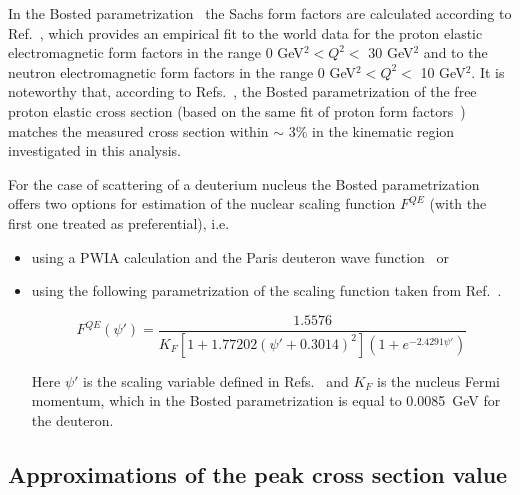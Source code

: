 In the Bosted parametrization~\cite{Bosted_fit,Bosted:2007xd} the Sachs form factors are calculated according to Ref.~\cite{Bosted:1994tm}, which provides an empirical fit to the world data for the proton elastic electromagnetic form factors in the range 0 GeV$^{2}$$< Q^{2} <$ 30 GeV$^{2}$ and to the neutron electromagnetic form factors in the range 0 GeV$^{2}$$< Q^{2} <$ 10 GeV$^{2}$. It is noteworthy that, according to Refs.~\cite{Fed_an_note:2017,Fed_paper_2018}, the Bosted parametrization of the free proton elastic cross section (based on the same fit of proton form factors~\cite{Bosted:1994tm}) matches the measured cross section within $\sim$ 3\% in the kinematic region investigated in this analysis.

For the case of scattering of a deuterium nucleus the Bosted parametrization~\cite{Bosted_fit,Bosted:2007xd} offers two options for estimation of the nuclear scaling function $F^{QE}$ (with the first one treated as preferential), i.e.\vspace{-0.25em}

\begin{itemize}
\item using a PWIA calculation and the Paris deuteron wave function~\cite{Bosted:2007xd} or\vspace{-0.25em}

\item using the following parametrization of the scaling function taken from Ref.~\cite{Bodek:2014pka}.\vspace{-0.25em}

\begin{equation}
F^{QE}(\psi') = \frac{1.5576}{K_{F}[1 + 1.77202(\psi' + 0.3014)^{2}](1 + e^{-2.4291\psi'})}\label{eq:fqe_scaling}
\end{equation}

Here $\psi'$ is the scaling variable defined in Refs.~\cite{Bodek:2014pka,Amaro:2004bs} and $K_{F}$ is the nucleus Fermi momentum, which in the Bosted parametrization is equal to 0.0085~GeV for the deuteron.\vspace{-0.25em}

\end{itemize}


\subsection*{Approximations of the peak cross section value}

